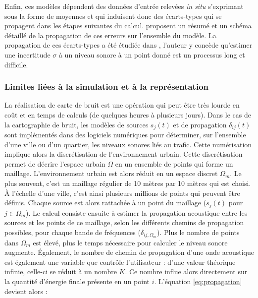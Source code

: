 Enfin, ces modèles dépendent des données d'entrée relevées \textit{in situ} s'exprimant sous la forme de moyennes et qui induisent donc des écarts-types qui se propagent dans les étapes suivantes du calcul. \cite{van_leeuwen_noise_2015} proposent un résumé et un schéma détaillé de la propagation de ces erreurs sur l'ensemble du modèle. La propagation de ces écarts-types a été étudiée dans \cite{probst2005uncertainties}, l'auteur y concède qu'estimer une incertitude $\sigma$ à un niveau sonore à un point donné est un processus long et difficile.


\subsubsection{Limites liées à la simulation et à la représentation}

La réalisation de carte de bruit est une opération qui peut être très lourde en coût et en temps de calculs (de quelques heures à plusieurs jours).
Dans le cas de la cartographie de bruit, les modèles de sources $s_j(t)$ et de propagation $\delta_{ij}(t)$ sont implémentés dans des logiciels numériques pour déterminer, sur l'ensemble d'une ville ou d'un quartier, les niveaux sonores liés au trafic. Cette numérisation implique alors la discrétisation de l'environnement urbain. Cette discrétisation permet de décrire l'espace urbain $\Omega$ en un ensemble de points qui forme un maillage. L'environnement urbain est alors réduit en un espace discret $\Omega_m$. Le plus souvent, c'est un maillage régulier de 10 mètres par 10 mètres qui est choisi. À l'échelle d'une ville, c'est ainsi plusieurs millions de points qui peuvent être définis. Chaque source est alors rattachée à un point du maillage ($s_{j}(t)$ pour $j\in\Omega_m$). Le calcul consiste ensuite à estimer la propagation acoustique entre les sources et les points de ce maillage, selon les différents chemins de propagation possibles, pour chaque bande de fréquences ($\delta_{ij,\Omega_m}$). Plus le nombre de points dans $\Omega_{m}$ est élevé, plus le temps nécessaire pour calculer le niveau sonore augmente.  
Également, le nombre de chemin de propagation d'une onde acoustique est également une variable que contrôle l'utilisateur : d'une valeur théorique infinie, celle-ci se réduit à un nombre $K$. Ce nombre influe alors directement sur la quantité d'énergie finale présente en un point $i$. L'équation \ref{eq:propagation} devient alors : 

